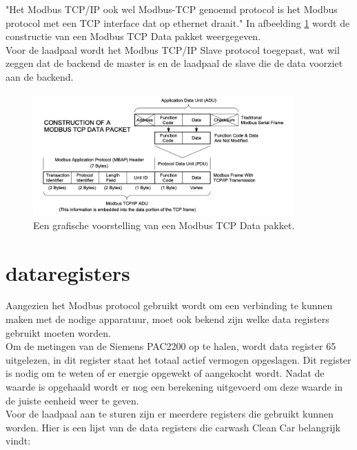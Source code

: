 "Het Modbus TCP/IP ook wel Modbus-TCP genoemd protocol is het Modbus protocol met een TCP interface dat op ethernet draait." \autocite{Acromag2005} In afbeelding \ref{fig:modbus-data-pakket} wordt de constructie van een Modbus TCP Data pakket weergegeven.\\

Voor de laadpaal wordt het Modbus TCP/IP Slave protocol toegepast, wat wil zeggen dat de backend de master is en de laadpaal de slave die de data voorziet aan de backend.

\begin{figure}[h]
    \includegraphics[width=10cm]{./graphics/Modbus-TCP-schema.png}
    \caption{Een grafische voorstelling van een Modbus TCP Data pakket. \autocite{Acromag2005}}
    \label{fig:modbus-data-pakket}
\end{figure}

\section{dataregisters}
\label{sec:stand-van-zaken-dataregisters}

Aangezien het Modbus protocol gebruikt wordt om een verbinding te kunnen maken met de nodige apparatuur, moet ook bekend zijn welke data registers gebruikt moeten worden.\\

Om de metingen van de Siemens PAC2200 op te halen, wordt data register 65 uitgelezen, in dit register staat het totaal actief vermogen opgeslagen. Dit register is nodig om te weten of er energie opgewekt of aangekocht wordt. Nadat de waarde is opgehaald wordt er nog een berekening uitgevoerd om deze waarde in de juiste eenheid weer te geven.\\

Voor de laadpaal aan te sturen zijn er meerdere registers die gebruikt kunnen worden. Hier is een lijst van de data registers die carwash Clean Car belangrijk vindt:

